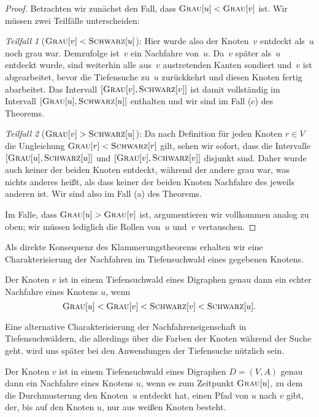 \begin{proof}
Betrachten wir zunächst den Fall, dass $\mathop{\text{\textsc{Grau}}}[u] < \mathop{\text{\textsc{Grau}}}[v]$ ist.
Wir müssen zwei Teilfälle unterscheiden:

\emph{Teilfall 1} ($\mathop{\text{\textsc{Grau}}}[v] < \mathop{\text{\textsc{Schwarz}}}[u]$):
Hier wurde also der Knoten~$v$ entdeckt als~$u$ noch grau war.
Demzufolge ist~$v$ ein Nachfahre von~$u$.
Da~$v$ später als~$u$ entdeckt wurde, sind weiterhin alle aus~$v$ austretenden Kanten sondiert und~$v$ ist abgearbeitet, bevor die Tiefensuche zu~$u$ zurückkehrt und diesen Knoten fertig abarbeitet.
Das Intervall $\left[\mathop{\text{\textsc{Grau}}}[v],\mathop{\text{\textsc{Schwarz}}}[v]\right]$ ist damit vollständig im Intervall $[\mathop{\text{\textsc{Grau}}}[u],\mathop{\text{\textsc{Schwarz}}}[u]]$ enthalten und wir sind im Fall (c) des Theorems.

\emph{Teilfall 2} ($\mathop{\text{\textsc{Grau}}}[v] > \mathop{\text{\textsc{Schwarz}}}[u]$):
Da nach Definition für jeden Knoten $r \in V$ die Ungleichung $\mathop{\text{\textsc{Grau}}}[r] < \mathop{\text{\textsc{Schwarz}}}[r]$ gilt, sehen wir sofort, dass die Intervalle $\left[\mathop{\text{\textsc{Grau}}}[u],\mathop{\text{\textsc{Schwarz}}}[u]\right]$ und $[\mathop{\text{\textsc{Grau}}}[v],\mathop{\text{\textsc{Schwarz}}}[v]]$ disjunkt sind.
Daher wurde auch keiner der beiden Knoten entdeckt, während der andere grau war, was nichts anderes heißt, als dass keiner der beiden Knoten Nachfahre des jeweils anderen ist.
Wir sind also im Fall (a) des Theorems.

Im Falle, dass $\mathop{\text{\textsc{Grau}}}[u] > \mathop{\text{\textsc{Grau}}}[v]$ ist, argumentieren wir vollkommen analog zu oben; wir müssen lediglich die Rollen von~$u$ und~$v$ vertauschen.
\end{proof}

\begin{bem}
Als direkte Konsequenz des Klammerungstheorems erhalten wir eine Charakterisierung der Nachfahren im Tiefensuchwald eines gegebenen Knotens.
\end{bem} 

\begin{kor}
\label{cor:nachfahre-tiefenwald}
Der Knoten $v$ ist in einem Tiefensuchwald eines Digraphen genau dann ein echter Nachfahre eines Knotens $u$, wenn
\[
\mathop{\text{\textsc{Grau}}}[u] < \mathop{\text{\textsc{Grau}}}[v] < \mathop{\text{\textsc{Schwarz}}}[v]  < \mathop{\text{\textsc{Schwarz}}}[u].
\]
\end{kor}

\begin{bem} 
Eine alternative Charakterisierung der Nachfahreneigenschaft in Tiefensuchwäldern, die allerdings über die Farben der Knoten während der Suche geht, wird uns später bei den Anwendungen der Tiefensuche nützlich sein. 
\end{bem} 

\begin{thm}
\label{thm:weisse-pfade-thm}
Der Knoten $v$ ist in einem Tiefensuchwald eines Digraphen $D=(V,A)$ genau dann ein Nachfahre eines Knotens $u$, wenn es zum Zeitpunkt $\mathop{\text{\textsc{Grau}}}[u]$, zu dem die Durchmusterung den Knoten~$u$ entdeckt hat, einen Pfad von $u$ nach $v$ gibt, der, bis auf den Knoten $u$, nur aus weißen Knoten besteht.
\end{thm}

